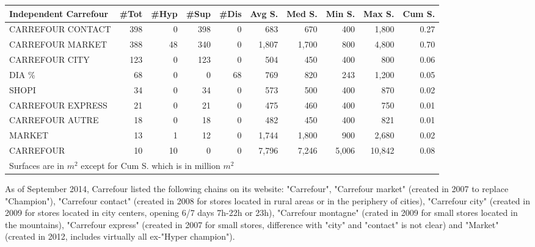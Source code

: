 \documentclass[11pt]{article}
\begin{document}
\begin{table}[H]
\footnotesize
\setlength{\tabcolsep}{2pt}

\begin{tabular}{lrrrrrrrrr}
\toprule
Independent Carrefour &       \#Tot &       \#Hyp &       \#Sup &       \#Dis &     Avg S. &     Med S. &     Min S. &     Max S. &     Cum S. \\
\midrule
CARREFOUR CONTACT &        398 &          0 &        398 &          0 &        683 &        670 &        400 &      1,800 &       0.27 \\
CARREFOUR MARKET  &        388 &         48 &        340 &          0 &      1,807 &      1,700 &        800 &      4,800 &       0.70 \\
CARREFOUR CITY    &        123 &          0 &        123 &          0 &        504 &        450 &        400 &        800 &       0.06 \\
DIA \%             &         68 &          0 &          0 &         68 &        769 &        820 &        243 &      1,200 &       0.05 \\
SHOPI             &         34 &          0 &         34 &          0 &        573 &        500 &        400 &        870 &       0.02 \\
CARREFOUR EXPRESS &         21 &          0 &         21 &          0 &        475 &        460 &        400 &        750 &       0.01 \\
CARREFOUR AUTRE   &         18 &          0 &         18 &          0 &        482 &        450 &        400 &        821 &       0.01 \\
MARKET            &         13 &          1 &         12 &          0 &      1,744 &      1,800 &        900 &      2,680 &       0.02 \\
CARREFOUR         &         10 &         10 &          0 &          0 &      7,796 &      7,246 &      5,006 &     10,842 &       0.08 \\
\bottomrule
\multicolumn{10}{l}{\footnotesize Surfaces are in $m^2$ except for Cum S. which is in million $m^2$} \\
\end{tabular}

\end{table}

As of September 2014, Carrefour listed the following chains on its website: "Carrefour", "Carrefour market" (created in 2007 to replace "Champion"), "Carrefour contact" (created in 2008 for stores located in rural areas or in the periphery of cities), "Carrefour city" (created in 2009 for stores located in city centers, opening 6/7 days 7h-22h or 23h), "Carrefour montagne" (crated in 2009 for small stores located in the mountains), "Carrefour express" (created in 2007 for small stores, difference with "city" and "contact" is not clear) and "Market" (created in 2012, includes virtually all ex-"Hyper champion").
\end{document}
